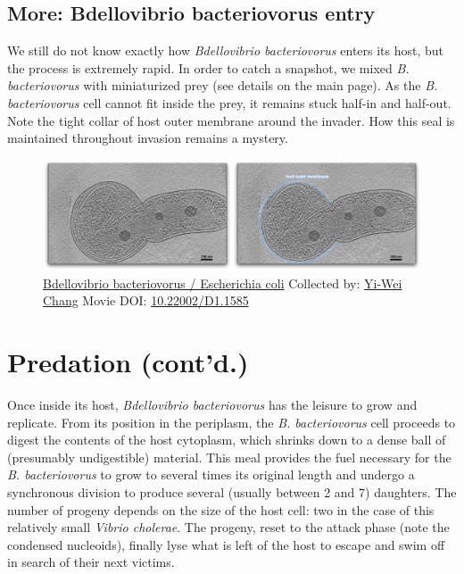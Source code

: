 \documentclass[]{tufte-book}
\begin{document}
\hypertarget{Bdellovibrio_bacteriovorus_entry}{\subsection*{More:
Bdellovibrio bacteriovorus
entry}\label{Bdellovibrio_bacteriovorus_entry}}

We still do not know exactly how \emph{Bdellovibrio bacteriovorus}
enters its host, but the process is extremely rapid. In order to catch a
snapshot, we mixed \emph{B. bacteriovorus} with miniaturized prey (see
details on the main page). As the \emph{B. bacteriovorus} cell cannot
fit inside the prey, it remains stuck half-in and half-out. Note the
tight collar of host outer membrane around the invader. How this seal is
maintained throughout invasion remains a mystery.






\begin{figure}
\includegraphics{movie_stills/9_10a} \caption[\protect\hyperlink{tree}{Bdellovibrio bacteriovorus /
Escherichia coli} Collected by: \protect\hyperlink{yi-wei_chang}{Yi-Wei
Chang} Movie DOI:
\href{https://doi.org/10.22002/D1.1585}{10.22002/D1.1585}]{\protect\hyperlink{tree}{Bdellovibrio bacteriovorus /
Escherichia coli} Collected by: \protect\hyperlink{yi-wei_chang}{Yi-Wei
Chang} Movie DOI:
\href{https://doi.org/10.22002/D1.1585}{10.22002/D1.1585}}\label{fig:9-10a}
\end{figure}

\section{Predation (cont'd.)}\label{predation-contd.-1}

Once inside its host, \emph{Bdellovibrio bacteriovorus} has the leisure
to grow and replicate. From its position in the periplasm, the \emph{B.
bacteriovorus} cell proceeds to digest the contents of the host
cytoplasm, which shrinks down to a dense ball of (presumably
undigestible) material. This meal provides the fuel necessary for the
\emph{B. bacteriovorus} to grow to several times its original length and
undergo a synchronous division to produce several (usually between 2 and
7) daughters. The number of progeny depends on the size of the host
cell: two in the case of this relatively small \emph{Vibrio cholerae}.
The progeny, reset to the attack phase (note the condensed nucleoids),
finally lyse what is left of the host to escape and swim off in search
of their next victims.
\end{document}
